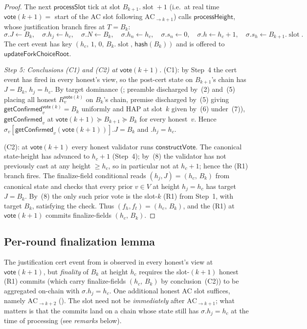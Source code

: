 \documentclass{article}
\newcommand{\slot}[0]{\ensuremath{\operatorname{\mathrm{slot}}}}
\newcommand{\hash}{\mathsf{hash}}
\newcommand{\vote}{\mathsf{vote}}
\newcommand{\processSlot}{\textsf{processSlot}\xspace}
\newcommand{\processHeight}{\textsf{processHeight}\xspace}
\newcommand{\constructVote}{\textsf{constructVote}\xspace}
\newcommand{\updateForkChoiceRoot}{\textsf{updateForkChoiceRoot}\xspace}
\newcommand{\getConfirmed}{\textsf{getConfirmed}\xspace}
\theoremstyle{plain}
\theoremstyle{definition}
\theoremstyle{remark}
\begin{document}
\begin{proof}
The next $\processSlot$ tick at slot $B_{k+1}.\slot + 1$ (i.e.\ at real time $\vote(k+1) =$ start of the AC slot following $\mathrm{AC}_{\to k+1}$) calls $\processHeight$, whose justification branch fires at $T = B_k$:
\[
  \sigma.J \gets B_k,\quad \sigma.h_j \gets h_c,\quad \sigma.N \gets B_k,\quad \sigma.h_n \gets h_c,\quad \sigma.s_n \gets 0,\quad \sigma.h \gets h_c + 1,\quad \sigma.s_h \gets B_{k+1}.\slot.
\]
The cert event has key $(h_c,\, 1,\, 0,\, B_k.\slot,\, \hash(B_k))$ and is offered to $\updateForkChoiceRoot$.

\emph{Step 5: Conclusions \mbox{(C1)} and \mbox{(C2)} at $\vote(k+1)$.}
\mbox{(C1)}: by Step~4 the cert event has fired in every honest's view, so the post-cert state on $B_{k+1}$'s chain has $J = B_k$, $h_j = h_c$. By target dominance (; preamble discharged by~(2) and~(5) placing all honest $R_v^{\vote(k)}$ on $B_k$'s chain, premise discharged by~(5) giving $\getConfirmed_v^{\vote(k)} = B_k$ uniformly and HAP at slot~$k$ given by~(6) under~(7)), $\getConfirmed_v$ at $\vote(k+1) \succeq B_{k+1} \succeq B_k$ for every honest~$v$. Hence $\sigma_v[\getConfirmed_v(\vote(k+1))].J = B_k$ and $.h_j = h_c$.

\mbox{(C2)}: at $\vote(k+1)$ every honest validator runs $\constructVote$. The canonical state-height has advanced to $h_c + 1$ (Step~4); by~(8) the validator has not previously cast at any height $\geq h_c$, so in particular not at $h_c + 1$; hence the \mbox{(R1)} branch fires. The finalize-field conditional reads $(h_j, J) = (h_c,\, B_k)$ from canonical state and checks that every prior $v \in V$ at height $h_j = h_c$ has target $J = B_k$. By~(8) the only such prior vote is the slot-$k$ \mbox{(R1)} from Step~1, with target $B_k$, satisfying the check. Thus $(f_h, f_t) = (h_c,\, B_k)$, and the \mbox{(R1)} at $\vote(k+1)$ commits finalize-fields $(h_c,\, B_k)$.
\end{proof}

\subsection{Per-round finalization lemma}\label{rev:subsec:per-round-finality}

The justification cert event from  is observed in every honest's view at $\vote(k+1)$, but \emph{finality} of $B_k$ at height $h_c$ requires the slot-$(k+1)$ honest \mbox{(R1)} commits (which carry finalize-fields $(h_c,\, B_k)$ by conclusion~(C2)) to be aggregated on-chain with $\sigma.h_j = h_c$. One additional honest AC slot suffices, namely $\mathrm{AC}_{\to k+2}$ (). The slot need not be \emph{immediately} after $\mathrm{AC}_{\to k+1}$; what matters is that the commits land on a chain whose state still has $\sigma.h_j = h_c$ at the time of processing (see \emph{remarks} below).
\end{document}
